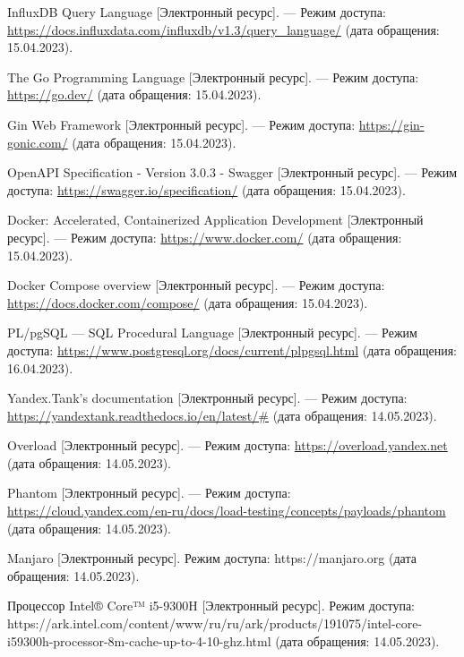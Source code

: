 \begin{thebibliography}{}
	 InfluxDB Query Language [Электронный ресурс]. — Режим доступа: \url{https://docs.influxdata.com/influxdb/v1.3/query_language/} (дата обращения: 15.04.2023).
	 
	 The Go Programming Language [Электронный ресурс]. — Режим доступа: \url{https://go.dev/} (дата обращения: 15.04.2023).
	 
	 Gin Web Framework [Электронный ресурс]. — Режим доступа: \url{https://gin-gonic.com/} (дата обращения: 15.04.2023).
	 
	 OpenAPI Specification - Version 3.0.3 - Swagger [Электронный ресурс]. — Режим доступа: \url{https://swagger.io/specification/} (дата обращения: 15.04.2023).
	 
	 Docker: Accelerated, Containerized Application Development [Электронный ресурс]. — Режим доступа: \url{https://www.docker.com/} (дата обращения: 15.04.2023).
	 
	 Docker Compose overview [Электронный ресурс]. — Режим доступа: \url{https://docs.docker.com/compose/} (дата обращения: 15.04.2023).
	 
	 PL/pgSQL — SQL Procedural Language [Электронный ресурс]. — Режим доступа: \url{https://www.postgresql.org/docs/current/plpgsql.html} (дата обращения: 16.04.2023).
	 
	 Yandex.Tank’s documentation [Электронный ресурс]. — Режим доступа: \url{https://yandextank.readthedocs.io/en/latest/#} (дата обращения: 14.05.2023).
	 
	 Overload [Электронный ресурс]. — Режим доступа: \url{https://overload.yandex.net} (дата обращения: 14.05.2023).
	 
	 Phantom [Электронный ресурс]. — Режим доступа: \url{https://cloud.yandex.com/en-ru/docs/load-testing/concepts/payloads/phantom} (дата обращения: 14.05.2023).
	 
	 Manjaro [Электронный ресурс]. Режим доступа: https://manjaro.org (дата обращения: 14.05.2023).
	 
	 Процессор Intel® Core™ i5-9300H [Электронный ресурс]. Режим доступа: https://ark.intel.com/content/www/ru/ru/ark/products/191075/intel-core-i59300h-processor-8m-cache-up-to-4-10-ghz.html (дата обращения: 14.05.2023).
\end{thebibliography}
\endgroup

\pagebreak